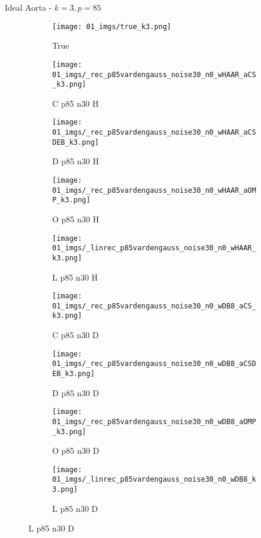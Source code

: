 \begin{frame}{Ideal Aorta - $k=3,p=85$}{}
\begin{figure}
\begin{subfigure}{0.1\textwidth}
\texttt{[image: 01\_imgs/true\_k3.png]}
\caption*{\Tiny True}
\end{subfigure}
\begin{subfigure}{0.1\textwidth}
\texttt{[image: 01\_imgs/\_rec\_p85vardengauss\_noise30\_n0\_wHAAR\_aCS\_k3.png]}
\caption*{\Tiny C p85 n30 H}
\end{subfigure}
\begin{subfigure}{0.1\textwidth}
\texttt{[image: 01\_imgs/\_rec\_p85vardengauss\_noise30\_n0\_wHAAR\_aCSDEB\_k3.png]}
\caption*{\Tiny D p85 n30 H}
\end{subfigure}
\begin{subfigure}{0.1\textwidth}
\texttt{[image: 01\_imgs/\_rec\_p85vardengauss\_noise30\_n0\_wHAAR\_aOMP\_k3.png]}
\caption*{\Tiny O p85 n30 H}
\end{subfigure}
\begin{subfigure}{0.1\textwidth}
\texttt{[image: 01\_imgs/\_linrec\_p85vardengauss\_noise30\_n0\_wHAAR\_k3.png]}
\caption*{\Tiny L p85 n30 H}
\end{subfigure}
\begin{subfigure}{0.1\textwidth}
\texttt{[image: 01\_imgs/\_rec\_p85vardengauss\_noise30\_n0\_wDB8\_aCS\_k3.png]}
\caption*{\Tiny C p85 n30 D}
\end{subfigure}
\begin{subfigure}{0.1\textwidth}
\texttt{[image: 01\_imgs/\_rec\_p85vardengauss\_noise30\_n0\_wDB8\_aCSDEB\_k3.png]}
\caption*{\Tiny D p85 n30 D}
\end{subfigure}
\begin{subfigure}{0.1\textwidth}
\texttt{[image: 01\_imgs/\_rec\_p85vardengauss\_noise30\_n0\_wDB8\_aOMP\_k3.png]}
\caption*{\Tiny O p85 n30 D}
\end{subfigure}
\begin{subfigure}{0.1\textwidth}
\texttt{[image: 01\_imgs/\_linrec\_p85vardengauss\_noise30\_n0\_wDB8\_k3.png]}
\caption*{\Tiny L p85 n30 D}
\end{subfigure}
\end{figure}
\end{frame}

